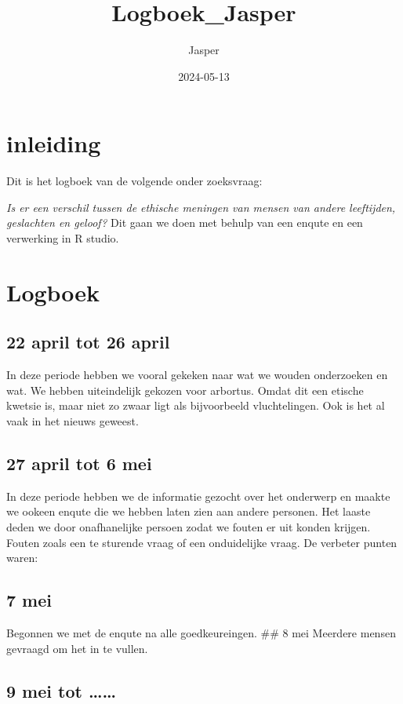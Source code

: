 \documentclass[
]{article}
\title{Logboek\_Jasper}
\author{Jasper}
\date{2024-05-13}
\begin{document}
\maketitle

\section{inleiding}\label{inleiding}

Dit is het logboek van de volgende onder zoeksvraag:

\emph{Is er een verschil tussen de ethische meningen van mensen van
andere leeftijden, geslachten en geloof?} Dit gaan we doen met behulp
van een enqute en een verwerking in R studio.

\section{Logboek}\label{logboek}

\subsection{22 april tot 26 april}\label{april-tot-26-april}

In deze periode hebben we vooral gekeken naar wat we wouden onderzoeken
en wat. We hebben uiteindelijk gekozen voor arbortus. Omdat dit een
etische kwetsie is, maar niet zo zwaar ligt als bijvoorbeeld
vluchtelingen. Ook is het al vaak in het nieuws geweest.

\subsection{\texorpdfstring{27 april tot 6 mei
}{27 april tot 6 mei  }}\label{april-tot-6-mei}

In deze periode hebben we de informatie gezocht over het onderwerp en
maakte we ookeen enqute die we hebben laten zien aan andere personen.
Het laaste deden we door onafhanelijke persoen zodat we fouten er uit
konden krijgen. Fouten zoals een te sturende vraag of een onduidelijke
vraag. De verbeter punten waren:

\subsection{7 mei}\label{mei}

Begonnen we met de enqute na alle goedkeureingen. \#\# 8 mei Meerdere
mensen gevraagd om het in te vullen.

\subsection{9 mei tot \ldots\ldots{}}\label{mei-tot}
\end{document}
